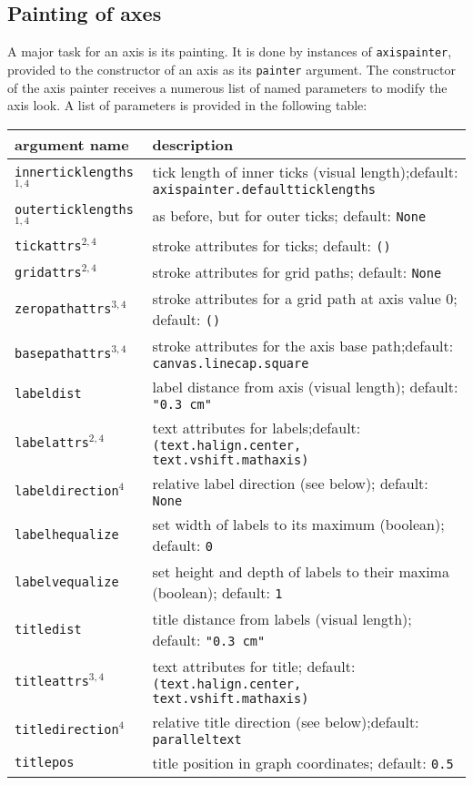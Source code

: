 \subsection{Painting of axes}

A major task for an axis is its painting. It is done by instances of
\verb|axispainter|, provided to the constructor of an axis as its
\verb|painter| argument. The constructor of the axis painter receives
a numerous list of named parameters to modify the axis look. A list of
parameters is provided in the following table:

\medskip
\begin{tabularx}{\linewidth}{l>{\raggedright\arraybackslash}X}
argument name&description\\
\hline
\texttt{innerticklengths}$^{1,4}$&tick length of inner ticks (visual length);\newline default: \texttt{axispainter.defaultticklengths}\\
\texttt{outerticklengths}$^{1,4}$&as before, but for outer ticks; default: \texttt{None}\\
\texttt{tickattrs}$^{2,4}$&stroke attributes for ticks; default: \texttt{()}\\
\texttt{gridattrs}$^{2,4}$&stroke attributes for grid paths; default: \texttt{None}\\
\texttt{zeropathattrs}$^{3,4}$&stroke attributes for a grid path at axis value 0; default: \texttt{()}\\
\texttt{basepathattrs}$^{3,4}$&stroke attributes for the axis base path;\newline default: \texttt{canvas.linecap.square}\\
\texttt{labeldist}&label distance from axis (visual length); default: \texttt{"0.3 cm"}\\
\texttt{labelattrs}$^{2,4}$&text attributes for labels;\newline default: \texttt{(text.halign.center, text.vshift.mathaxis)}\\
\texttt{labeldirection}$^4$&relative label direction (see below); default: \texttt{None}\\
\texttt{labelhequalize}&set width of labels to its maximum (boolean); default: \texttt{0}\\
\texttt{labelvequalize}&set height and depth of labels to their maxima (boolean); default: \texttt{1}\\
\texttt{titledist}&title distance from labels (visual length); default: \texttt{"0.3 cm"}\\
\texttt{titleattrs}$^{3,4}$&text attributes for title; default: \texttt{(text.halign.center, text.vshift.mathaxis)}\\
\texttt{titledirection}$^4$&relative title direction (see below);\newline default: \texttt{paralleltext}\\
\texttt{titlepos}&title position in graph coordinates; default: \texttt{0.5}\\
\end{tabularx}
\medskip

